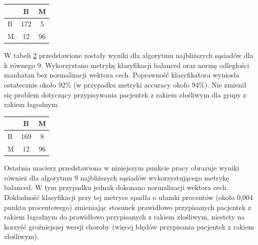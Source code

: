 \documentclass[12pt]{article}
\begin{document}
\begin{table}[H]
\begin{center}
\label{accuracy_9-NN_manhatan_bnorm} 
\begin{LARGE}
\begin{tabular}{l|c|c|}
\cline{2-3}
                        & B & M \\ \hline
\multicolumn{1}{|l|}{B} & 172 & 5 \\ \hline
\multicolumn{1}{|l|}{M} & 12 & 96 \\ \hline
\end{tabular}
\end{LARGE}
\end{center}
\end{table}

\indent W tabeli \ref{balanced_9-NN_euklides_bnorm} przedstawione zostały wyniki dla algorytmu najbliższych sąsiadów dla k równego 9. Wykorzystano metrykę klasyfikacji balanced oraz normę odległości manhatan bez normalizacji wektora cech. Poprawność klasyfikatora wyniosła ostatecznie około 92\% (w przypadku metryki accuracy około 94\%). Nie zmienił się problem dotyczący przypisywania pacjentek z rakiem złośliwym dla grupy z rakiem łagodnym.

\begin{table}[H]
\begin{center}
\label{balanced_9-NN_euklides_bnorm} 
\begin{LARGE}
\begin{tabular}{l|c|c|}
\cline{2-3}
                        & B & M \\ \hline
\multicolumn{1}{|l|}{B} & 169 & 8 \\ \hline
\multicolumn{1}{|l|}{M} & 12 & 96 \\ \hline
\end{tabular}
\end{LARGE}
\end{center}
\end{table}

\indent Ostatnia macierz przedstawiona w niniejszym punkcie pracy obrazuje wyniki również dla algorytmu 9 najbliższych sąsiadów wykorzystującego metrykę balanced. W tym przypadku jednak dokonano normalizacji wektora cech. Dokładność klasyfikacji przy tej metryce spadła o ułamki procentów (około 0,004 punktu procentowego) zmieniając stosunek prawidłowo przypisanych pacjentek z rakiem łagodnym do prawidłowo przypisanych  z rakiem złośliwym, niestety na korzyść groźniejszej wersji choroby (więcej błędów przypisania pacjentek z rakiem złośliwym).
\end{document}
